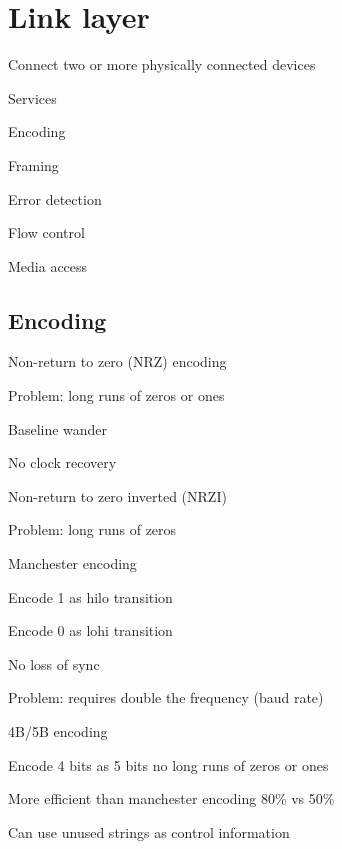 \section{Link layer}
\enumstart
	\item Connect two or more physically connected devices
	\item Services
	\enumstart
		\item Encoding
		\item Framing
		\item Error detection
		\item Flow control
		\item Media access
	\enumend
\enumend

\subsection{Encoding}
\enumstart
 	\item Non-return to zero (NRZ) encoding
 	\\ 
 	\enumstart
	 	\item Problem: long runs of zeros or ones
	 	\enumstart
	 		\item Baseline wander
	 		\item No clock recovery
 		\enumend
 	\enumend
 	\item Non-return to zero inverted (NRZI)
 	\\ 
 	\enumstart
 		\item Problem: long runs of zeros
 	\enumend
 	\item Manchester encoding
 	\\ 
 	\enumstart
 		\item Encode 1 as hi\arrow lo transition
 		\item Encode 0 as lo\arrow hi transition
 		\item No loss of sync
 		\item Problem: requires double the frequency (baud rate)
 	\enumend
 	\item 4B/5B encoding
 	\enumstart
 		\item Encode 4 bits as 5 bits \arrow no long runs of zeros or ones
 		\item More efficient than manchester encoding 80\% vs 50\%
 		\item Can use unused strings as control information
 	\enumend
\enumend

